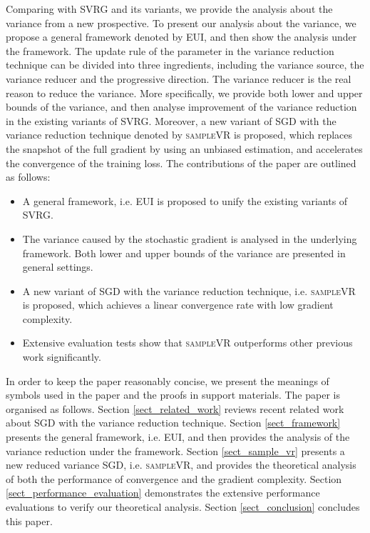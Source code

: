 \documentclass[letterpaper]{article}
\begin{document}
 Comparing with SVRG and its variants, we provide the analysis about the variance from a new prospective. To present our analysis about the variance, we propose  a general framework denoted by EUI, and then show the analysis under the framework. The  update rule of the parameter in the variance reduction technique can be divided into three ingredients, including the variance source, the variance reducer and the progressive direction. The variance reducer is the real reason to reduce the variance.  More specifically, we provide both lower and upper bounds of the variance, and then analyse improvement of the variance reduction in the existing variants of SVRG.   Moreover, a new variant of SGD with the variance reduction technique denoted by \textsc{sampleVR} is proposed, which replaces the snapshot of the full gradient by using an unbiased estimation, and accelerates the convergence of the training loss.  The contributions of the paper are outlined as follows:
\begin{itemize}
\item A general framework, i.e. EUI is proposed to unify the existing variants of SVRG. 
\item The variance caused by the stochastic gradient is analysed in the underlying framework. Both lower and upper bounds of the variance are presented in general settings.
\item A new variant of SGD with the variance reduction technique, i.e. \textsc{sampleVR} is proposed, which achieves a linear convergence rate with low gradient complexity.
\item Extensive evaluation tests show that \textsc{sampleVR} outperforms  other previous work significantly. 
\end{itemize}

In order to keep the paper reasonably concise, we present  the meanings of symbols used in the paper and the proofs in support materials. The paper is organised as follows. Section \ref{sect_related_work} reviews recent related work about SGD with the variance reduction technique. Section \ref{sect_framework}  presents the general framework, i.e. EUI, and then provides the analysis of the variance reduction under the framework. Section \ref{sect_sample_vr} presents a new reduced variance SGD, i.e. \textsc{sampleVR}, and provides the theoretical analysis of both the performance of convergence and the gradient complexity.   Section \ref{sect_performance_evaluation} demonstrates the extensive performance evaluations to verify our theoretical analysis. Section \ref{sect_conclusion} concludes this paper. 
\end{document}
